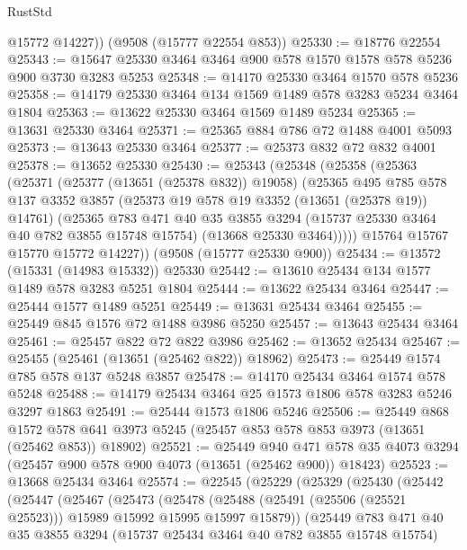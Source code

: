 \begin{lexlean}{RustStd}
\begin{coremodule}
        @15772
        @14227))
    (@9508 (@15777 @22554 @853))
@25330 := @18776 @22554
@25343 := @15647 @25330 @3464 @3464 @900 @578 @1570 @1578 @578 @5236 @900 @3730 @3283 @5253
@25348 := @14170 @25330 @3464 @1570 @578 @5236
@25358 := @14179 @25330 @3464 @134 @1569 @1489 @578 @3283 @5234 @3464 @1804
@25363 := @13622 @25330 @3464 @1569 @1489 @5234
@25365 := @13631 @25330 @3464
@25371 := @25365 @884 @786 @72 @1488 @4001 @5093
@25373 := @13643 @25330 @3464
@25377 := @25373 @832 @72 @832 @4001
@25378 := @13652 @25330
@25430 := @25343
    (@25348
      (@25358
        (@25363
          (@25371
            (@25377 (@13651 (@25378 @832)) @19058)
            (@25365
              @495
              @785
              @578
              @137
              @3352
              @3857
              (@25373 @19 @578 @19 @3352 (@13651 (@25378 @19)) @14761)
              (@25365
                @783
                @471
                @40
                @35
                @3855
                @3294
                (@15737 @25330 @3464 @40 @782 @3855 @15748 @15754)
                (@13668 @25330 @3464)))))
        @15764
        @15767
        @15770
        @15772
        @14227))
    (@9508 (@15777 @25330 @900))
@25434 := @13572 (@15331 (@14983 @15332)) @25330
@25442 := @13610 @25434 @134 @1577 @1489 @578 @3283 @5251 @1804
@25444 := @13622 @25434 @3464
@25447 := @25444 @1577 @1489 @5251
@25449 := @13631 @25434 @3464
@25455 := @25449 @845 @1576 @72 @1488 @3986 @5250
@25457 := @13643 @25434 @3464
@25461 := @25457 @822 @72 @822 @3986
@25462 := @13652 @25434
@25467 := @25455 (@25461 (@13651 (@25462 @822)) @18962)
@25473 := @25449 @1574 @785 @578 @137 @5248 @3857
@25478 := @14170 @25434 @3464 @1574 @578 @5248
@25488 := @14179 @25434 @3464 @25 @1573 @1806 @578 @3283 @5246 @3297 @1863
@25491 := @25444 @1573 @1806 @5246
@25506 := @25449
    @868
    @1572
    @578
    @641
    @3973
    @5245
    (@25457 @853 @578 @853 @3973 (@13651 (@25462 @853)) @18902)
@25521 := @25449
    @940
    @471
    @578
    @35
    @4073
    @3294
    (@25457 @900 @578 @900 @4073 (@13651 (@25462 @900)) @18423)
@25523 := @13668 @25434 @3464
@25574 := @22545
    (@25229
      (@25329
        (@25430
          (@25442
            (@25447
              (@25467
                (@25473
                  (@25478
                    (@25488 (@25491 (@25506 (@25521 @25523))) @15989 @15992 @15995 @15997 @15879))
                  (@25449
                    @783
                    @471
                    @40
                    @35
                    @3855
                    @3294
                    (@15737 @25434 @3464 @40 @782 @3855 @15748 @15754)

\end{coremodule}
\end{lexlean}
